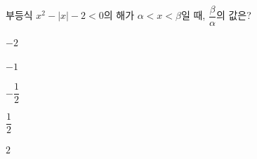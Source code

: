 \hspace*{2mm}\begin{minipage}[t]{\dimexpr\linewidth-2mm\relax}\vspace{0pt}
부등식 $x^2-|x|-2<0$의 해가 $\alpha<x<\beta$일 때, $\dfrac{\beta}{\alpha}$의 값은?
\begin{choices32}{\rule[-3ex]{0pt}{8ex}$-2$}{\rule[-3ex]{0pt}{8ex}$-1$}{\rule[-3ex]{0pt}{8ex}$-\dfrac{1}{2}$}{\rule[-3ex]{0pt}{8ex}$\dfrac{1}{2}$}{\rule[-3ex]{0pt}{8ex}$2$}\end{choices32}\end{minipage}
